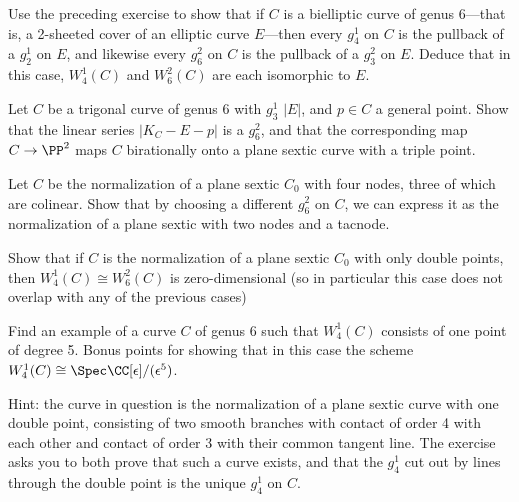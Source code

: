 \begin{exercise}
Use the preceding exercise to show that if $C$ is a bielliptic curve of genus 6---that is, a 2-sheeted cover of an elliptic curve $E$---then every $g^1_4$ on $C$ is the pullback of a $g^1_2$ on $E$, and likewise  every $g^2_6$ on $C$ is the pullback of a $g^2_3$ on $E$. Deduce that in this case, $W^1_4(C)$ and $W^2_6(C)$ are each isomorphic to $E$.
\end{exercise}


\begin{exercise}
Let $C$ be a trigonal curve of genus 6 with $g^1_3$ $|E|$, and $p \in C$ a general point. Show that the linear series $|K_C - E-p|$ is a $g^2_6$, and that the corresponding map $C \to \PP^2$ maps $C$ birationally onto a plane sextic curve with a triple point.
\end{exercise}


\begin{exercise}\label{plane models}
Let $C$ be the normalization of a plane sextic $C_0$ with four nodes, three of which are colinear. Show that by choosing a different $g^2_6$ on $C$, we can express it as the normalization of a plane sextic with two nodes and a tacnode.
\end{exercise}


\begin{exercise}
Show that if $C$ is the normalization of a plane sextic $C_0$ with only double points, then $W^1_4(C) \cong W^2_6(C)$ is zero-dimensional (so in particular this case does not overlap with any of the previous cases)
\end{exercise}


\begin{exercise}
Find an example of a curve $C$ of genus 6 such that $W^1_4(C)$ consists of one point of degree 5. Bonus points for showing that in this case the scheme $W^1_4(C) \cong \Spec \CC[\epsilon]/(\epsilon^5)$.
\end{exercise}

Hint: the curve in question is the normalization of a plane sextic curve with one double point, consisting of two smooth branches with contact of order 4 with each other and contact of order 3 with their common tangent line. The exercise asks you to both prove that such a curve exists, and that the $g^1_4$ cut out by lines through the double point is the unique $g^1_4$ on $C$. 

